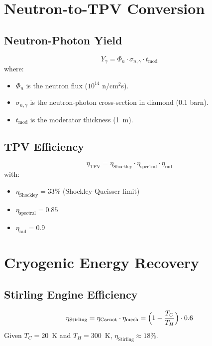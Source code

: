 \documentclass[12pt]{article}
\begin{document}
\section{Neutron-to-TPV Conversion}
\subsection{Neutron-Photon Yield}
\begin{equation}
    Y_{\gamma} = \Phi_n \cdot \sigma_{n,\gamma} \cdot t_{\text{mod}}
\end{equation}
where:
\begin{itemize}
    \item $\Phi_n$ is the neutron flux ($10^{14}$ n/cm$^2$s).
    \item $\sigma_{n,\gamma}$ is the neutron-photon cross-section in diamond (0.1 barn).
    \item $t_{\text{mod}}$ is the moderator thickness (1~m).
\end{itemize}

\subsection{TPV Efficiency}
\begin{equation}
    \eta_{\text{TPV}} = \eta_{\text{Shockley}} \cdot \eta_{\text{spectral}} \cdot \eta_{\text{rad}}
\end{equation}
with:
\begin{itemize}
    \item $\eta_{\text{Shockley}} = 33\%$ (Shockley-Queisser limit)
    \item $\eta_{\text{spectral}} = 0.85$
    \item $\eta_{\text{rad}} = 0.9$
\end{itemize}

\section{Cryogenic Energy Recovery}
\subsection{Stirling Engine Efficiency}
\begin{equation}
    \eta_{\text{Stirling}} = \eta_{\text{Carnot}} \cdot \eta_{\text{mech}} = \Bigl(1 - \frac{T_C}{T_H}\Bigr) \cdot 0.6
\end{equation}
Given $T_C = 20$~K and $T_H = 300$~K, $\eta_{\text{Stirling}} \approx 18\%$.
\end{document}
